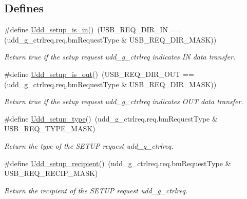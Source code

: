 \subsection*{\-Defines}
\begin{DoxyCompactItemize}
\item 
\#define \hyperlink{group__udd__group_gaffd9b7cf165cd149868373fa12595d12}{\-Udd\-\_\-setup\-\_\-is\-\_\-in}()~(\-U\-S\-B\-\_\-\-R\-E\-Q\-\_\-\-D\-I\-R\-\_\-\-I\-N == (udd\-\_\-g\-\_\-ctrlreq.\-req.\-bm\-Request\-Type \& \-U\-S\-B\-\_\-\-R\-E\-Q\-\_\-\-D\-I\-R\-\_\-\-M\-A\-S\-K))
\begin{DoxyCompactList}\small\item\em \-Return true if the setup request {\itshape udd\-\_\-g\-\_\-ctrlreq\/} indicates \-I\-N data transfer. \end{DoxyCompactList}\item 
\#define \hyperlink{group__udd__group_gaf67b7c8de30fdc881b567385f2345926}{\-Udd\-\_\-setup\-\_\-is\-\_\-out}()~(\-U\-S\-B\-\_\-\-R\-E\-Q\-\_\-\-D\-I\-R\-\_\-\-O\-U\-T == (udd\-\_\-g\-\_\-ctrlreq.\-req.\-bm\-Request\-Type \& \-U\-S\-B\-\_\-\-R\-E\-Q\-\_\-\-D\-I\-R\-\_\-\-M\-A\-S\-K))
\begin{DoxyCompactList}\small\item\em \-Return true if the setup request {\itshape udd\-\_\-g\-\_\-ctrlreq\/} indicates \-O\-U\-T data transfer. \end{DoxyCompactList}\item 
\#define \hyperlink{group__udd__group_ga85dc2b7b6c270e8dd8323fa4779a7ca2}{\-Udd\-\_\-setup\-\_\-type}()~(udd\-\_\-g\-\_\-ctrlreq.\-req.\-bm\-Request\-Type \& \-U\-S\-B\-\_\-\-R\-E\-Q\-\_\-\-T\-Y\-P\-E\-\_\-\-M\-A\-S\-K)
\begin{DoxyCompactList}\small\item\em \-Return the type of the \-S\-E\-T\-U\-P request {\itshape udd\-\_\-g\-\_\-ctrlreq\/}. \end{DoxyCompactList}\item 
\#define \hyperlink{group__udd__group_gac963bb7b8a965c2fec45a71c9faca6f5}{\-Udd\-\_\-setup\-\_\-recipient}()~(udd\-\_\-g\-\_\-ctrlreq.\-req.\-bm\-Request\-Type \& \-U\-S\-B\-\_\-\-R\-E\-Q\-\_\-\-R\-E\-C\-I\-P\-\_\-\-M\-A\-S\-K)
\begin{DoxyCompactList}\small\item\em \-Return the recipient of the \-S\-E\-T\-U\-P request {\itshape udd\-\_\-g\-\_\-ctrlreq\/}. \end{DoxyCompactList}\end{DoxyCompactItemize}
